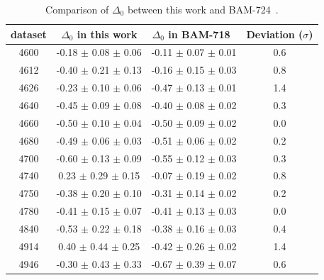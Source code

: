 \begin{table}[H]
    \centering
    \caption{Comparison of $\Delta_0$ between this work and BAM-724~\cite{ESIIImemo:LcDecayAsy}. }
    \label{tab:delta0-compare}
    \begin{tabular}{cccc}
    \hline\hline
dataset & $\Delta_0$ in this work & $\Delta_0$ in BAM-718~\cite{ESIIImemo:LcDecayAsy} & Deviation ($\sigma$)\\\hline
4600 & -0.18 $\pm$ 0.08 $\pm$ 0.06 & -0.11 $\pm$ 0.07 $\pm$ 0.01 & 0.6 \\
4612 & -0.40 $\pm$ 0.21 $\pm$ 0.13 & -0.16 $\pm$ 0.15 $\pm$ 0.03 & 0.8 \\
4626 & -0.23 $\pm$ 0.10 $\pm$ 0.06 & -0.47 $\pm$ 0.13 $\pm$ 0.01 & 1.4 \\
4640 & -0.45 $\pm$ 0.09 $\pm$ 0.08 & -0.40 $\pm$ 0.08 $\pm$ 0.02 & 0.3 \\
4660 & -0.50 $\pm$ 0.10 $\pm$ 0.04 & -0.50 $\pm$ 0.09 $\pm$ 0.02 & 0.0 \\
4680 & -0.49 $\pm$ 0.06 $\pm$ 0.03 & -0.51 $\pm$ 0.06 $\pm$ 0.02 & 0.2 \\
4700 & -0.60 $\pm$ 0.13 $\pm$ 0.09 & -0.55 $\pm$ 0.12 $\pm$ 0.03 & 0.3 \\
4740 & 0.23 $\pm$ 0.29 $\pm$ 0.15 & -0.07 $\pm$ 0.19 $\pm$ 0.02 & 0.8 \\
4750 & -0.38 $\pm$ 0.20 $\pm$ 0.10 & -0.31 $\pm$ 0.14 $\pm$ 0.02 & 0.2 \\
4780 & -0.41 $\pm$ 0.15 $\pm$ 0.07 & -0.41 $\pm$ 0.13 $\pm$ 0.03 & 0.0 \\
4840 & -0.53 $\pm$ 0.22 $\pm$ 0.18 & -0.38 $\pm$ 0.16 $\pm$ 0.03 & 0.4 \\
4914 & 0.40 $\pm$ 0.44 $\pm$ 0.25 & -0.42 $\pm$ 0.26 $\pm$ 0.02 & 1.4 \\
4946 & -0.30 $\pm$ 0.43 $\pm$ 0.33 & -0.67 $\pm$ 0.39 $\pm$ 0.07 & 0.6 \\
\hline\hline
    \end{tabular}
\end{table}

